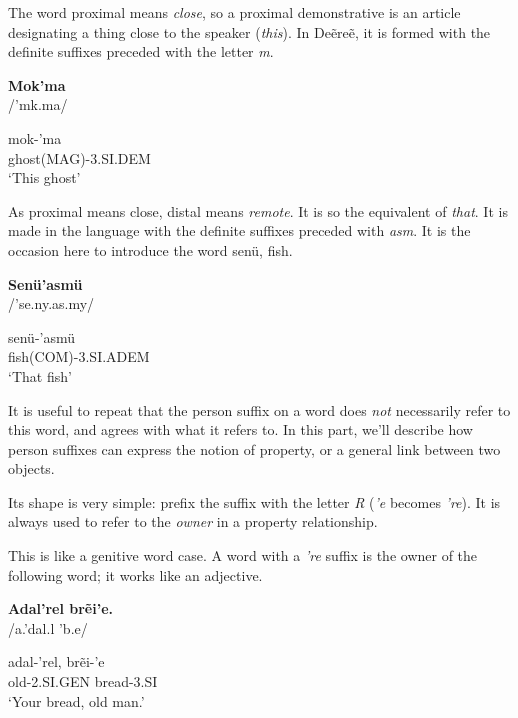 The word proximal means \emph{close}, so a proximal demonstrative is an article designating a thing
close to the speaker (\emph{this}). In Deẽreẽ, it is formed with the definite suffixes preceded with
the letter \emph{m}.

\begin{exe}
\ex\label{exe:person-prox-dem}
\textbf{Mok’ma}\\
/'m{\ipaO}k.ma/

\gll mok-’ma\\
ghost(MAG)-3.SI.DEM\\
\trans ‘This ghost’
\end{exe}

As proximal means close, distal means \emph{remote}. It is so the equivalent of \emph{that}. It is
made in the language with the definite suffixes preceded with \emph{asm}. It is the occasion here to
introduce the word \gls{senü}, fish.

\begin{exe}
\ex\label{exe:person-dist-dem}
\textbf{Senü’asmü}\\
/'se.ny.as.my/

\gll \gls{senü}-’asmü\\
fish(COM)-3.SI.ADEM\\
\trans ‘That fish’
\end{exe}

It is useful to repeat that the person suffix on a word does \emph{not} necessarily refer to this
word, and agrees with what it refers to. In this part, we’ll describe how person suffixes can
express the notion of property, or a general link between two objects.

Its shape is very simple: prefix the suffix with the letter \emph{R} (\emph{’e} becomes \emph{’re}).
It is always used to refer to the \emph{owner} in a property relationship.

This is like a genitive word case. A word with a \emph{’re} suffix is the owner of the following
word; it works like an adjective.

\begin{exe}
\ex\label{exe:person-gen-2obj}
\textbf{Adal’rel brẽi’e.}\\
/a.'dal.{\ipaR\ipaE}l 'b{\ipaR\ipaET}.e/

\gll \gls{adal}-’rel, \gls{brẽi}-’e\\
old-2.SI.GEN bread-3.SI\\
\trans ‘Your bread, old man.’
\end{exe}

